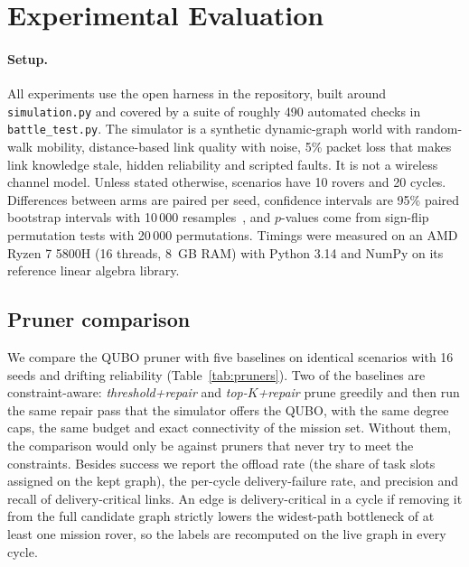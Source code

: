 \documentclass[11pt]{article}
\newcommand{\code}[1]{\texttt{#1}}
\begin{document}
\section{Experimental Evaluation}
\label{sec:eval}

\paragraph{Setup.}
All experiments use the open harness in the repository, built around
\code{simulation.py} and covered by a suite of roughly 490 automated checks
in \code{battle\_test.py}. The
simulator is a synthetic dynamic-graph world with random-walk mobility,
distance-based link quality with noise, 5\% packet loss that makes link
knowledge stale, hidden reliability and scripted faults. It is not a wireless
channel model. Unless stated otherwise, scenarios have 10 rovers and 20
cycles. Differences between arms are paired per seed, confidence intervals
are 95\% paired bootstrap intervals with 10\,000 resamples~\cite{efron1993},
and $p$-values come from sign-flip permutation tests with 20\,000
permutations. Timings were measured on an AMD Ryzen 7 5800H (16 threads,
8~GB RAM) with Python 3.14 and NumPy on its reference linear algebra library.

\subsection{Pruner comparison}
\label{sec:pruners}

We compare the QUBO pruner with five baselines on identical scenarios with 16
seeds and drifting reliability (Table~\ref{tab:pruners}). Two of the baselines
are constraint-aware: \emph{threshold+repair} and \emph{top-$K$+repair} prune
greedily and then run the same repair pass that the simulator offers the QUBO,
with the same degree caps, the same budget and exact connectivity of the
mission set. Without them, the comparison would only be against pruners that
never try to meet the constraints. Besides success we report the offload rate
(the share of task slots assigned on the kept graph), the per-cycle
delivery-failure rate, and precision and recall of delivery-critical links.
An edge is delivery-critical in a cycle if removing it from the full
candidate graph strictly lowers the widest-path bottleneck of at least one
mission rover, so the labels are recomputed on the live graph in every cycle.
\end{document}
